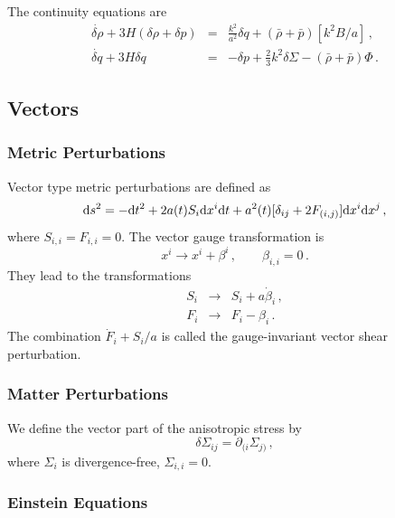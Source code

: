 \documentclass[12pt,letterpaper,rotate]{article}
\def\beq{\begin{equation}}
\def\eeq{\end{equation}}
\def\bea{\begin{eqnarray}}
\def\eea{\end{eqnarray}}
\def\d{{\rm d}}
\begin{document}
{\begin{itemize}
The continuity equations are
\begin{eqnarray}
\label{equ:con}
\dot{\delta \rho} + 3 H (\delta \rho + \delta p) &=& \frac{k^2}{a^2} \delta q + (\bar \rho + \bar p) [ k^2  B/a] \, ,\\
\dot{\delta q} + 3 H \delta q &=& - \delta p + \frac{2}{3} k^2 \delta \Sigma - (\bar \rho + \bar p) \Phi\, .
\end{eqnarray}

\end{itemize}


\subsection{Vectors}

\subsubsection{Metric Perturbations}

Vector type metric perturbations are defined as
\beq
\label{equ:Vmetric}
\d s^2 = - \d t^2 + 2 a(t) S_{i} \d x^i \d t +  a^2(t) [\delta_{ij}+2 F_{(i, j)} ] \d x^i \d x^j\, ,
\eeq
where $S_{i,i}= F_{i,i} = 0$.
The
vector gauge transformation is
\beq
x^i \to x^i + \beta^i\, , \qquad \beta_{i,i}=0\, .
\eeq
They lead to the transformations
\bea
S_i &\to& S_i + a \dot \beta_i\, , \\
F_i &\to& F_i - \beta_i\, .
\eea
The combination $\dot F_i + S_i/a$ is called the gauge-invariant vector shear perturbation.

\subsubsection{Matter Perturbations}

We define the vector part of the anisotropic stress by
\beq
\delta \Sigma_{ij} = \partial_{(i} \Sigma_{j)}\, , 
\eeq
where $\Sigma_i$ is divergence-free, $\Sigma_{i,i} =0$.

\subsubsection{Einstein Equations}

}
\end{document}
